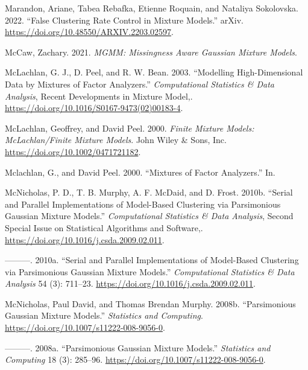 \begin{CSLReferences}{1}{0}
\leavevmode{}%
Marandon, Ariane, Tabea Rebafka, Etienne Roquain, and Nataliya Sokolovska. 2022. {``False Clustering Rate Control in Mixture Models.''} arXiv. \url{https://doi.org/10.48550/ARXIV.2203.02597}.

\leavevmode{}%
McCaw, Zachary. 2021. \emph{MGMM: Missingness Aware Gaussian Mixture Models}.

\leavevmode{}%
McLachlan, G. J., D. Peel, and R. W. Bean. 2003. {``Modelling High-Dimensional Data by Mixtures of Factor Analyzers.''} \emph{Computational Statistics \& Data Analysis}, Recent {Developments} in {Mixture} {Model},. \url{https://doi.org/10.1016/S0167-9473(02)00183-4}.

\leavevmode{}%
McLachlan, Geoffrey, and David Peel. 2000. \emph{Finite {Mixture Models}: {McLachlan}/{Finite Mixture Models}}. {John Wiley \& Sons, Inc.} \url{https://doi.org/10.1002/0471721182}.

\leavevmode{}%
Mclachlan, G., and David Peel. 2000. {``Mixtures of {Factor} {Analyzers}.''} In.

\leavevmode{}%
McNicholas, P. D., T. B. Murphy, A. F. McDaid, and D. Frost. 2010b. {``Serial and Parallel Implementations of Model-Based Clustering via Parsimonious {Gaussian} Mixture Models.''} \emph{Computational Statistics \& Data Analysis}, Second {Special} {Issue} on {Statistical} {Algorithms} and {Software},. \url{https://doi.org/10.1016/j.csda.2009.02.011}.

\leavevmode{}%
---------. 2010a. {``Serial and Parallel Implementations of Model-Based Clustering via Parsimonious Gaussian Mixture Models.''} \emph{Computational Statistics \& Data Analysis} 54 (3): 711--23. \url{https://doi.org/10.1016/j.csda.2009.02.011}.

\leavevmode{}%
McNicholas, Paul David, and Thomas Brendan Murphy. 2008b. {``Parsimonious {Gaussian} Mixture Models.''} \emph{Statistics and Computing}. \url{https://doi.org/10.1007/s11222-008-9056-0}.

\leavevmode{}%
---------. 2008a. {``Parsimonious Gaussian Mixture Models.''} \emph{Statistics and Computing} 18 (3): 285--96. \url{https://doi.org/10.1007/s11222-008-9056-0}.


\end{CSLReferences}
